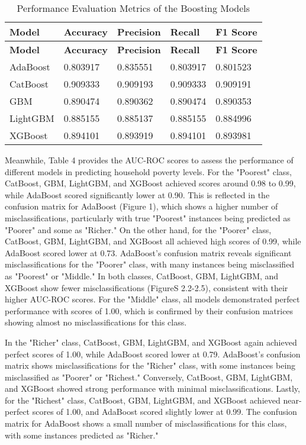 \documentclass[a4paper,fleqn]{cas-sc}
\begin{document}
\begin{longtable}{lllll}
    \caption{Performance Evaluation Metrics of the Boosting Models} \\
    \toprule
    \textbf{Model} & \textbf{Accuracy} & \textbf{Precision} & \textbf{Recall} & \textbf{F1 Score} \\
    \midrule
    \endfirsthead
    \midrule
    \textbf{Model} & \textbf{Accuracy} & \textbf{Precision} & \textbf{Recall} & \textbf{F1 Score} \\
    \midrule
    \endhead
    \bottomrule
    \endfoot
    \bottomrule
    \endlastfoot
    AdaBoost & 0.803917 & 0.835551 & 0.803917 & 0.801523 \\
    CatBoost & 0.909333 & 0.909193 & 0.909333 & 0.909191 \\
    GBM & 0.890474 & 0.890362 & 0.890474 & 0.890353 \\
    LightGBM & 0.885155 & 0.885137 & 0.885155 & 0.884996 \\
    XGBoost & 0.894101 & 0.893919 & 0.894101 & 0.893981 \\
\end{longtable}

Meanwhile, Table 4 provides the AUC-ROC scores to assess the performance of different models in predicting household poverty levels. For the "Poorest" class, CatBoost, GBM, LightGBM, and XGBoost achieved scores around 0.98 to 0.99, while AdaBoost scored significantly lower at 0.90. This is reflected in the confusion matrix for AdaBoost (Figure 1), which shows a higher number of misclassifications, particularly with true "Poorest" instances being predicted as "Poorer" and some as "Richer." On the other hand, for the "Poorer" class, CatBoost, GBM, LightGBM, and XGBoost all achieved high scores of 0.99, while AdaBoost scored lower at 0.73. AdaBoost's confusion matrix reveals significant misclassifications for the "Poorer" class, with many instances being misclassified as "Poorest" or "Middle." In both classes, CatBoost, GBM, LightGBM, and XGBoost show fewer misclassifications (FigureS 2.2-2.5), consistent with their higher AUC-ROC scores. For the "Middle" class, all models demonstrated perfect performance with scores of 1.00, which is confirmed by their confusion matrices showing almost no misclassifications for this class.

In the "Richer" class, CatBoost, GBM, LightGBM, and XGBoost again achieved perfect scores of 1.00, while AdaBoost scored lower at 0.79. AdaBoost's confusion matrix shows misclassifications for the "Richer" class, with some instances being misclassified as "Poorer" or "Richest." Conversely, CatBoost, GBM, LightGBM, and XGBoost showed strong performance with minimal misclassifications. Lastly, for the "Richest" class, CatBoost, GBM, LightGBM, and XGBoost achieved near-perfect scores of 1.00, and AdaBoost scored slightly lower at 0.99. The confusion matrix for AdaBoost shows a small number of misclassifications for this class, with some instances predicted as "Richer."
\end{document}
